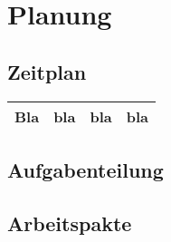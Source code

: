\chapter{Planung}
\section{Zeitplan}
\begin{tabularx}{\textwidth}{|X|c|c|c|} \hline
Bla & bla & bla & bla \\ \hline
\end{tabularx}
\section{Aufgabenteilung}
\section{Arbeitspakte}